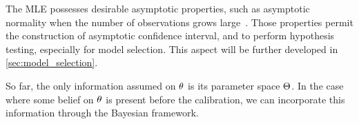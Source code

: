 \documentclass[../../Main_ManuscritThese.tex]{subfiles}
\begin{document}
The MLE possesses desirable asymptotic properties, such as asymptotic
normality when the number of observations grows
large~\cite{reid_aspects_2013}. Those properties permit the
construction of asymptotic confidence interval, and to perform
hypothesis testing, especially for model selection. This aspect will
be further developed in \cref{sec:model_selection}.


So far, the only information assumed on $\theta$ is its parameter space
$\Theta$. In the case where some belief on $\theta$ is present before
the calibration, we can incorporate this information through the
Bayesian framework.
\end{document}
